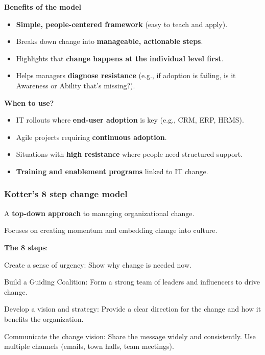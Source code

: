 \bigskip

\noindent\textbf{Benefits of the model}

\begin{itemize}
    \item \textbf{Simple, people-centered framework} (easy to teach and apply).
    \item Breaks down change into \textbf{manageable, actionable steps}.
    \item Highlights that \textbf{change happens at the individual level first}.
    \item Helps managers \textbf{diagnose resistance} (e.g., if adoption is failing, is it Awareness or Ability that’s missing?).
\end{itemize}

\bigskip

\noindent\textbf{When to use?}

\begin{itemize}
    \item IT rollouts where \textbf{end-user adoption} is key (e.g., CRM, ERP, HRMS).
    \item Agile projects requiring \textbf{continuous adoption}.
    \item Situations with \textbf{high resistance} where people need structured support.
    \item \textbf{Training and enablement programs} linked to IT change.
\end{itemize}

\subsubsection{Kotter's 8 step change model}

\indent 

A \textbf{top-down approach} to managing organizational change.

Focuses on creating momentum and embedding change into culture.

\noindent\textbf{The 8 steps}:

\step Create a sense of urgency: Show why change is needed now.

\step Build a Guiding Coalition: Form a strong team of leaders and influencers to drive change.

\step Develop a vision and strategy: Provide a clear direction for the change and how it benefits the organization.

\step Communicate the change vision: Share the message widely and consistently. Use multiple channels (emails, town halls, team meetings).

